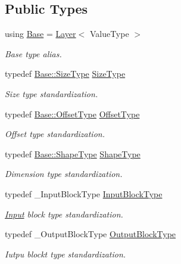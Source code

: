 \subsection*{Public Types}
\begin{DoxyCompactItemize}
\item 
using \hyperlink{classffnn_1_1layer_1_1_hidden_ac51b180aa7de47794148e32616f0441f}{Base} = \hyperlink{classffnn_1_1layer_1_1_layer}{Layer}$<$ Value\-Type $>$
\begin{DoxyCompactList}\small\item\em Base type alias. \end{DoxyCompactList}\item 
typedef \hyperlink{classffnn_1_1layer_1_1_layer_a109e7a20f18d04e6d6f029c816b0958a}{Base\-::\-Size\-Type} \hyperlink{classffnn_1_1layer_1_1_hidden_a3deb1dc4b3a83b3d6749474debee025f}{Size\-Type}
\begin{DoxyCompactList}\small\item\em Size type standardization. \end{DoxyCompactList}\item 
typedef \hyperlink{classffnn_1_1layer_1_1_layer_a5ed88ceefa1814e88fbccfdded6c9999}{Base\-::\-Offset\-Type} \hyperlink{classffnn_1_1layer_1_1_hidden_a4a191bc002b2545231a3d80c99004693}{Offset\-Type}
\begin{DoxyCompactList}\small\item\em Offset type standardization. \end{DoxyCompactList}\item 
typedef \hyperlink{classffnn_1_1layer_1_1_layer_a83bc836aeacb312f6507ce1b47f8f7eb}{Base\-::\-Shape\-Type} \hyperlink{classffnn_1_1layer_1_1_hidden_a7ed1a797fcb7bfb43d66c0eb24967882}{Shape\-Type}
\begin{DoxyCompactList}\small\item\em Dimension type standardization. \end{DoxyCompactList}\item 
typedef \-\_\-\-Input\-Block\-Type \hyperlink{classffnn_1_1layer_1_1_hidden_a01b9cc4df01a7b26423dcd3a0af17b1c}{Input\-Block\-Type}
\begin{DoxyCompactList}\small\item\em \hyperlink{classffnn_1_1layer_1_1_input}{Input} block type standardization. \end{DoxyCompactList}\item 
typedef \-\_\-\-Output\-Block\-Type \hyperlink{classffnn_1_1layer_1_1_hidden_abb03ddc71360cc7ebdab03cd4d1553ee}{Output\-Block\-Type}
\begin{DoxyCompactList}\small\item\em Iutpu blockt type standardization. \end{DoxyCompactList}\end{DoxyCompactItemize}

